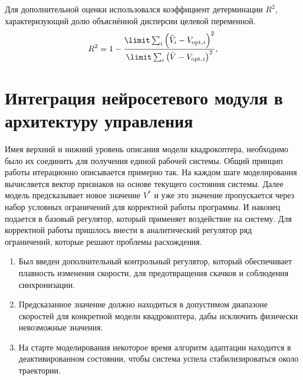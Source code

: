 Для дополнительной оценки использовался коэффициент детерминации $R^2$, характеризующий долю объяснённой дисперсии целевой переменной.
\begin{gather}
    R^2 = 1 - \frac{\limit\sum_i \left(\hat{V}_i - V_{\text{opt},i}\right)^2}{\limit\sum_i \left( \bar{V} - V_{\text{opt},i} \right)^2},
\end{gather}


\section{Интеграция нейросетевого модуля в архитектуру управления}

Имея верхний и нижний уровень описания модели квадрокоптера, необходимо было их соединить для получения единой рабочей системы.
Общий принцип работы итерационно описывается примерно так.
На каждом шаге моделирования вычисляется вектор признаков на основе текущего состояния системы.
Далее модель предсказывает новое значение $V^\ast$ и уже это значение пропускается через набор условных ограничений для корректной работы программы.
И наконец подается в базовый регулятор, который применяет воздействие на систему.
Для корректной работы пришлось внести в аналитический регулятор ряд ограничений, которые решают проблемы расхождения.
\begin{enumerate}
    \item Был введен дополнительный контрольный регулятор, который обеспечивает плавность изменения скорости, для предотвращения скачков и соблюдения синхронизации.
    \item Предсказанное значение должно находиться в допустимом диапазоне скоростей для конкретной модели квадрокоптера, дабы исключить физически невозможные значения.
    \item На старте моделирования некоторое время алгоритм адаптации находится в деактивированном состоянии, чтобы система успела стабилизироваться около траектории.
\end{enumerate}

